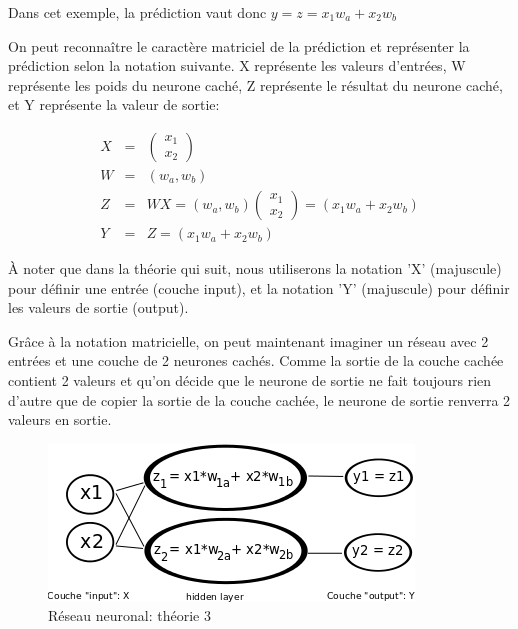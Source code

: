 \documentclass[11pt,a4paper]{report}
\begin{document}
    \par Dans cet exemple, la prédiction vaut donc $y = z = x_1w_a + x_2w_b$
    
    \par On peut reconnaître le caractère matriciel de la prédiction et représenter la prédiction selon la notation suivante. X représente les valeurs d'entrées, W représente les poids du neurone caché, Z représente le résultat du neurone caché, et Y représente la valeur de sortie: 
    
    \begin{eqnarray}
    X &=& \begin{pmatrix} x_1 \\ x_2 \end{pmatrix} \\
    W &=&  ( w_a , w_b ) \\
    Z &=& WX  = ( w_a , w_b )\begin{pmatrix} x_1 \\ x_2 \end{pmatrix} = (x_1w_a+x_2w_b)\\
    Y &=& Z = (x_1w_a+x_2w_b)
    \end{eqnarray}
    
    \par À noter que dans la théorie qui suit, nous utiliserons la notation 'X' (majuscule) pour définir une entrée (couche input), et la notation 'Y' (majuscule) pour définir les valeurs de sortie (output). 
    
    \par Grâce à la notation matricielle, on peut maintenant imaginer un réseau avec 2 entrées et une couche de 2 neurones cachés. Comme la sortie de la couche cachée contient 2 valeurs et qu'on décide que le neurone de sortie ne fait toujours rien d'autre que de copier la sortie de la couche cachée, le neurone de sortie renverra 2 valeurs en sortie. 
    
    \begin{figure}[!h]
    \center
    \includegraphics[scale=0.74]{ressources/nn_theory_3.png}
    \caption{Réseau neuronal: théorie 3}
    \end{figure} 
    
\end{document}
